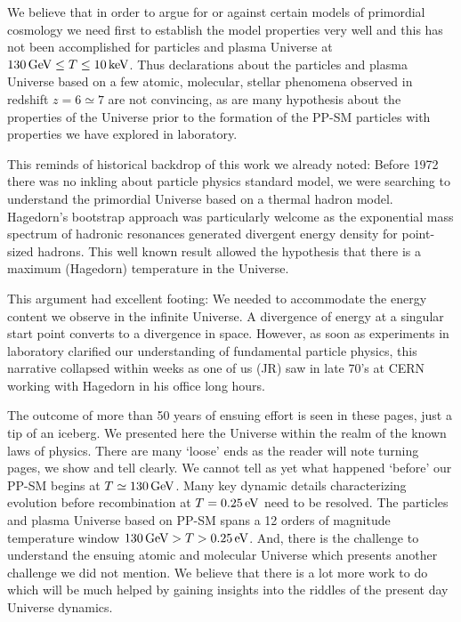 We believe that in order to argue for or against certain models of primordial cosmology we need first to establish the model properties very well and this has not been accomplished for particles and plasma Universe at $130\text{\,GeV}\le T\le 10\text{\,keV}$. Thus declarations about the particles and plasma Universe based on a few atomic, molecular, stellar phenomena observed in redshift $z=6\simeq7$ are not convincing, as are many hypothesis about the properties of the Universe prior to the formation of the PP-SM particles with properties we have explored in laboratory. 

This reminds of historical backdrop of this work we already noted: Before 1972 there was no inkling about particle physics standard model, we were searching to understand the primordial Universe based on a thermal hadron model. Hagedorn's bootstrap approach was particularly welcome as the exponential mass spectrum of hadronic resonances generated divergent energy density for point-sized hadrons. This well known result allowed the hypothesis that there is a maximum (Hagedorn) temperature in the Universe. 

This argument had excellent footing: We needed to accommodate the energy content we observe in the infinite Universe. A divergence of energy at a singular start point converts to a divergence in space. However, as soon as experiments in laboratory clarified our understanding of fundamental particle physics, this narrative collapsed within weeks as one of us  (JR) saw in late 70's at CERN working with Hagedorn in his office long hours. 

The outcome of more than 50 years of ensuing effort is seen in these pages, just a tip of an iceberg. We presented here the Universe within the realm of the known laws of physics. There are many `loose' ends as the reader will note turning pages, we show and tell clearly. We cannot tell as yet what happened `before' our PP-SM begins at $T\simeq 130\text{\,GeV}$. Many key dynamic details characterizing evolution before recombination at $T=0.25\text{\,eV}$ need to be resolved. The particles and plasma Universe based on PP-SM spans a 12 orders of magnitude temperature window $  130\text{\,GeV} > T > 0.25\text{\,eV} $. And, there is the challenge to understand the ensuing  atomic and molecular Universe  which presents another challenge we did not mention. We believe that there is a lot more work to do which will be much helped by gaining insights into the riddles of the present day Universe dynamics.